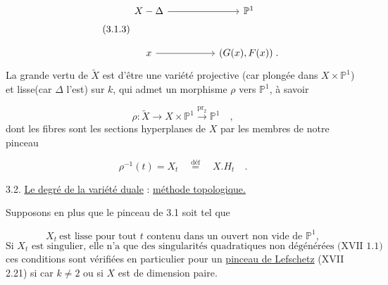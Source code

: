 \begin{equation}\tag{3.1.3}
\begin{tikzcd}[row sep=large, column sep=huge]
X - \Delta \arrow[r] & \mathbb{P}^1 \\
x \arrow[r] & (G(x),F(x))\;.
\end{tikzcd}
\end{equation}
La grande vertu de $\widetilde{X}$ est d'être une variété projective (car plongée dans $X \times \mathbb{P}^1$) et lisse(car $\Delta$ l'est) sur $k$, qui admet un morphisme $\rho$ vers $\mathbb{P}^1$, à savoir

\begin{equation}\tag{3.1.4}
\rho : \widetilde{X} \longrightarrow X \times \mathbb{P}^1 \stackrel{\mathrm{pr}_2}{\longrightarrow} \mathbb{P}^1 \quad ,
\end{equation}
dont les fibres sont les sections hyperplanes de $X$ par les membres de notre pinceau

\begin{equation*}
\rho^{-1}(t) = X_t \quad \stackrel{\text{déf}}{=} \quad X.H_t \quad .
\end{equation*}



3.2. \underline{Le degré de la variété duale} : \underline{méthode topologique.}

Supposons en plus que le pinceau de 3.1 soit tel que

\begin{equation}\tag{3.2.1}
X_t \ \text{est lisse pour tout } t \text{ contenu dans un ouvert non vide de } \mathbb{P}^1 ,
\end{equation}
\begin{equation}\tag{3.2.2}
\text{Si } X_t \text{ est singulier, elle n'a que des singularités quadratiques non dégénérées (XVII 1.1) ;}
\end{equation}
ces conditions sont vérifiées en particulier pour un \underline{pinceau de Lefschetz} (XVII 2.21) si car $k \neq 2$ ou si $X$ est de dimension paire.

